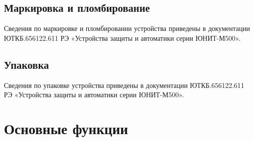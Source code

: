 \documentclass[a4paper, 12pt, table, hidelinks, DIV=calc]{extarticle}
\def\ManualUnitGeneral{ЮТКБ.656122.611 РЭ «Устройства защиты и автоматики серии ЮНИТ-М500»}
\begin{document}
\color{unidarkgreen}\subsection{Маркировка и пломбирование}\color{black}
Сведения по маркировке и пломбировании устройства приведены в документации \ManualUnitGeneral.

\color{unidarkgreen}\subsection{Упаковка}\color{black}
Сведения по упаковке устройства приведены в документации \ManualUnitGeneral.
\newpage
\color{unidarkgreen}\section[Основные функции]{Основные функции}\label{sec:funcs}
\color{black}

\color{black}
\end{document}
